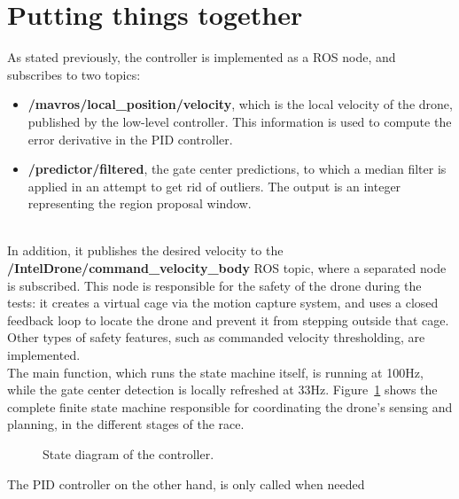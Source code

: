 \section{Putting things together}

As stated previously, the controller is implemented as a ROS node, and
subscribes to two topics:
\begin{itemize}
	\item{\textbf{/mavros/local\_position/velocity}, which is the local velocity
	of the drone, published by the low-level controller. This information is
	used to compute the error derivative in the PID controller.}
	\item{\textbf{/predictor/filtered}, the gate center predictions, to which a
	median filter is applied in an attempt to get rid of outliers. The output
	is an integer representing the region proposal window.}
\end{itemize}

~\\In addition, it publishes the desired velocity to the
\textbf{/IntelDrone/command\_velocity\_body} ROS topic, where a separated node
is subscribed. This node is responsible for the safety of the drone during the
tests: it creates a virtual cage via the motion capture system, and uses a
closed feedback loop to locate the drone and prevent it from stepping outside
that cage. Other types of safety features, such as commanded velocity
thresholding, are implemented.\\

The main function, which runs the state machine itself, is running at 100Hz,
while the gate center detection is locally refreshed at 33Hz.
Figure~\ref{fig:state} shows the complete finite state machine responsible for
coordinating the drone's sensing and planning, in the different stages of the
race.

\begin{figure}[h]
	\centering
	
	\caption{State diagram of the controller.}
	\label{fig:state}
\end{figure}

The PID controller on the other hand, is only called when needed
